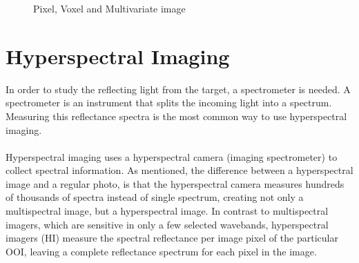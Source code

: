 \begin{figure}[H]
  \begin{minipage}{\wd\FigBox}
    \centering\usebox{\FigBox}
  \end{minipage}\hspace*{\FigHSkip}
  \caption[Pixel, Voxel and Multivariate Image]{Pixel, Voxel and Multivariate image}
  \label{fig:pogv}
\end{figure}

\vspace{1.3cm}
\section{Hyperspectral Imaging}
In order to study the reflecting light from the target, a spectrometer is needed. A spectrometer is an instrument that splits the incoming light into a spectrum. Measuring this reflectance spectra is the most common way to use hyperspectral imaging.
\\\\
Hyperspectral imaging uses a hyperspectral camera (imaging spectrometer) to collect spectral information. As mentioned, the difference between a hyperspectral image and a regular photo, is that the hyperspectral camera measures hundreds of thousands of spectra instead of single spectrum, creating not only a multispectral image, but a hyperspectral image. In contrast to multispectral imagers, which are sensitive in only a few selected wavebands, hyperspectral imagers (HI) measure the spectral reflectance per image pixel of the particular OOI, leaving a complete reflectance spectrum for each pixel in the image. \cite{pettersen_johnsen_bruheim_andreassen_2013} %

